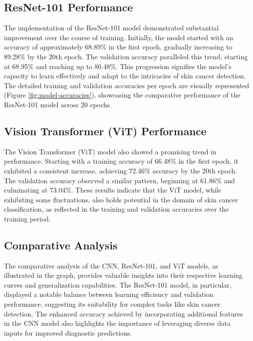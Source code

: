 \documentclass[conference]{IEEEtran}
\begin{document}
\subsection{ResNet-101 Performance}

The implementation of the ResNet-101 model demonstrated substantial improvement over the course of training. Initially, the model started with an accuracy of approximately 68.89\% in the first epoch, gradually increasing to 89.28\% by the 20th epoch. The validation accuracy paralleled this trend, starting at 68.95\% and reaching up to 80.48\%. This progression signifies the model's capacity to learn effectively and adapt to the intricacies of skin cancer detection. The detailed training and validation accuracies per epoch are visually represented (Figure \ref{fig:model-accuracies}), showcasing the comparative performance of the ResNet-101 model across 20 epochs.

\subsection{Vision Transformer (ViT) Performance}

The Vision Transformer (ViT) model also showed a promising trend in performance. Starting with a training accuracy of 66.48\% in the first epoch, it exhibited a consistent increase, achieving 72.46\% accuracy by the 20th epoch. The validation accuracy observed a similar pattern, beginning at 61.86\% and culminating at 73.04\%. These results indicate that the ViT model, while exhibiting some fluctuations, also holds potential in the domain of skin cancer classification, as reflected in the training and validation accuracies over the training period.

\subsection{Comparative Analysis}

The comparative analysis of the CNN, ResNet-101, and ViT models, as illustrated in the graph, provides valuable insights into their respective learning curves and generalization capabilities. The ResNet-101 model, in particular, displayed a notable balance between learning efficiency and validation performance, suggesting its suitability for complex tasks like skin cancer detection. The enhanced accuracy achieved by incorporating additional features in the CNN model also highlights the importance of leveraging diverse data inputs for improved diagnostic predictions.
\end{document}
